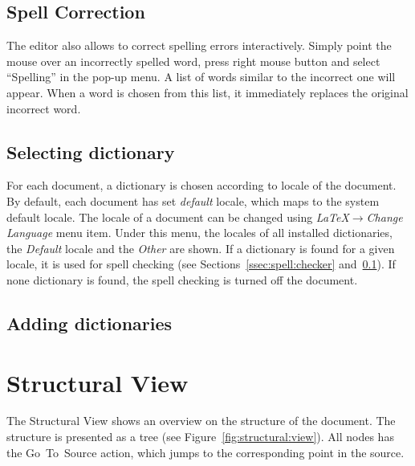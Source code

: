 \documentclass{article}
\begin{document}
\subsection{Spell Correction}

\label{ssec:spell:correction}

The editor also allows to correct spelling errors interactively. Simply point
the mouse over an incorrectly spelled word, press right mouse button and
select ``Spelling'' in the pop-up menu. A list of words similar to the incorrect
one will appear. When a word is chosen from this list, it immediately replaces the
original incorrect word.

\subsection{Selecting dictionary}

For each document, a dictionary is chosen according to locale of the document.
By default, each document has set \emph{default} locale, which maps to the
system default locale. The locale of a document can be changed using
\emph{LaTeX$\rightarrow$Change Language} menu item. Under this menu, the locales
of all installed dictionaries, the \emph{Default} locale and the \emph{Other} are
shown. If a dictionary is found for a given locale, it is used for spell checking
(see Sections~\ref{ssec:spell:checker} and~\ref{ssec:spell:correction}).
If none dictionary is found, the spell checking is turned off the document.


\subsection{Adding dictionaries}


\section{Structural View}

\label{sec:structural:view}

The Structural View shows an overview on the structure of the document.
The structure is presented as a tree (see Figure~\ref{fig:structural:view}).
All nodes has the
Go~To~Source action, which jumps to the corresponding point in the source.
\end{document}
